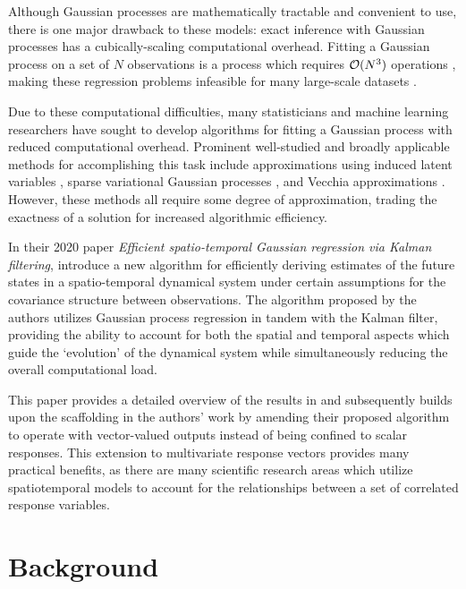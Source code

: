 \documentclass[10pt]{article}
\begin{document}
Although Gaussian processes are mathematically tractable and convenient to use, there is one major drawback to these models: exact inference with Gaussian processes has a cubically-scaling computational overhead. Fitting a Gaussian process on a set of $N$ observations is a process which requires $\mathcal{O}(N^{3})$ operations \citep{GPML-Book-2006}, making these regression problems infeasible for many large-scale datasets \citep{Guhaniyogi-Meta-Kriging-2018,Pfoertner-Comp-Aware-2025,Salari-GP-Turbines-2025}.

Due to these computational difficulties, many statisticians and machine learning researchers have sought to develop algorithms for fitting a Gaussian process with reduced computational overhead. Prominent well-studied and broadly applicable methods for accomplishing this task include approximations using induced latent variables \citep{Quinonero-Sparse-GP-2005}, sparse variational Gaussian processes \citep{Titsias-SVGP-2009}, and Vecchia approximations \citep{Katzfuss-Vecchia-2021}. However, these methods all require some degree of approximation, trading the exactness of a solution for increased algorithmic efficiency. 

In their 2020 paper \emph{Efficient spatio-temporal Gaussian regression via Kalman filtering}, \citeauthor{Todescato-Efficient-2020} introduce a new algorithm for efficiently deriving estimates of the future states in a spatio-temporal dynamical system under certain assumptions for the covariance structure between observations. The algorithm proposed by the authors utilizes Gaussian process regression in tandem with the Kalman filter, providing the ability to account for both the spatial and temporal aspects which guide the `evolution' of the dynamical system while simultaneously reducing the overall computational load. 

This paper provides a detailed overview of the results in \citet{Todescato-Efficient-2020} and subsequently builds upon the scaffolding in the authors' work by amending their proposed algorithm to operate with vector-valued outputs instead of being confined to scalar responses. This extension to multivariate response vectors provides many practical benefits, as there are many scientific research areas which utilize spatiotemporal models to account for the relationships between a set of correlated response variables.

\section{Background}
\label{sec:background}
\end{document}

